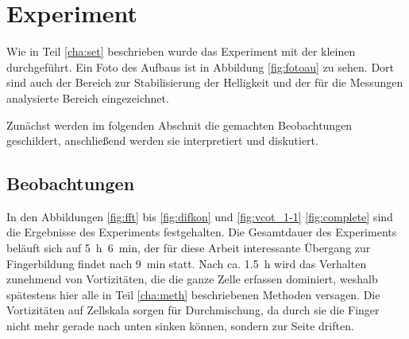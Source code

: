 % 



\section{\COTm Experiment}
\label{res:cot}


Wie in Teil \ref{cha:set} beschrieben wurde das \COTm Experiment mit der kleinen \HSC durchgeführt. Ein Foto des Aufbaus ist in Abbildung \ref{fig:fotoau} zu sehen. Dort sind auch der Bereich zur Stabilisierung der Helligkeit und der für die Messungen analysierte Bereich eingezeichnet.

Zunächst werden im folgenden Abschnit die gemachten Beobachtungen geschildert, anschließend werden sie interpretiert und diskutiert.


\subsection{Beobachtungen}
\label{res:cot:beob}



In den Abbildungen \ref{fig:fft} bis \ref{fig:difkon} und \ref{fig:vcot_1-1} \ref{fig:complete} sind die Ergebnisse des \COTm Experiments festgehalten. Die Gesamtdauer des Experiments beläuft sich auf \mbox{\SI{5}{\hour} \SI{6}{\minute}}, der für diese Arbeit interessante Übergang zur Fingerbildung findet nach \SI{9}{\minute} statt. Nach ca. \SI{1,5}{\hour} wird das Verhalten zunehmend von Vortizitäten, die die ganze Zelle erfassen dominiert, weshalb spätestens hier alle in Teil \ref{cha:meth} beschriebenen Methoden versagen. 
Die Vortizitäten auf Zellskala sorgen für Durchmischung, da durch sie die Finger nicht mehr gerade nach unten sinken können, sondern zur Seite driften.


